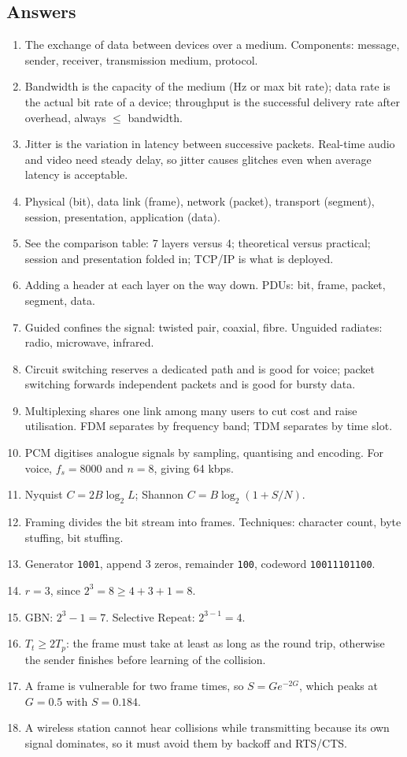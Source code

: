 \documentclass[11pt,a4paper]{article}
\begin{document}
\subsection*{Answers}
\begin{enumerate}
\item The exchange of data between devices over a medium. Components: message, sender, receiver, transmission medium, protocol.
\item Bandwidth is the capacity of the medium (Hz or max bit rate); data rate is the actual bit rate of a device; throughput is the successful delivery rate after overhead, always $\le$ bandwidth.
\item Jitter is the variation in latency between successive packets. Real-time audio and video need steady delay, so jitter causes glitches even when average latency is acceptable.
\item Physical (bit), data link (frame), network (packet), transport (segment), session, presentation, application (data).
\item See the comparison table: 7 layers versus 4; theoretical versus practical; session and presentation folded in; TCP/IP is what is deployed.
\item Adding a header at each layer on the way down. PDUs: bit, frame, packet, segment, data.
\item Guided confines the signal: twisted pair, coaxial, fibre. Unguided radiates: radio, microwave, infrared.
\item Circuit switching reserves a dedicated path and is good for voice; packet switching forwards independent packets and is good for bursty data.
\item Multiplexing shares one link among many users to cut cost and raise utilisation. FDM separates by frequency band; TDM separates by time slot.
\item PCM digitises analogue signals by sampling, quantising and encoding. For voice, $f_s = 8000$ and $n = 8$, giving 64 kbps.
\item Nyquist $C = 2B\log_2 L$; Shannon $C = B\log_2(1+S/N)$.
\item Framing divides the bit stream into frames. Techniques: character count, byte stuffing, bit stuffing.
\item Generator \texttt{1001}, append 3 zeros, remainder \texttt{100}, codeword \texttt{10011101100}.
\item $r = 3$, since $2^3 = 8 \ge 4 + 3 + 1 = 8$.
\item GBN: $2^3 - 1 = 7$. Selective Repeat: $2^{3-1} = 4$.
\item $T_t \ge 2T_p$: the frame must take at least as long as the round trip, otherwise the sender finishes before learning of the collision.
\item A frame is vulnerable for two frame times, so $S = Ge^{-2G}$, which peaks at $G = 0.5$ with $S = 0.184$.
\item A wireless station cannot hear collisions while transmitting because its own signal dominates, so it must avoid them by backoff and RTS/CTS.
\end{enumerate}
\end{document}
